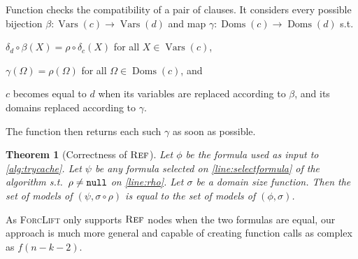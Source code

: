 \documentclass{article}
\newtheorem{theorem}{Theorem}
\newcommand{\nulll}{\texttt{\textup{null}}}
\DeclareMathOperator{\Reff}{\textsc{Ref}}
\DeclareMathOperator{\dom}{dom}
\DeclareMathOperator{\Doms}{Doms}
\DeclareMathOperator{\Vars}{Vars}
\begin{document}
Function \generateMaps checks the compatibility of a pair of clauses. It
considers every possible bijection $\beta\colon \Vars(c) \to \Vars(d)$ and map
$\gamma\colon \Doms(c) \to \Doms(d)$ s.t.
\begin{enumerate*}[label=(\roman*)]
  \item $\delta_{d} \circ \beta(X) = \rho \circ \delta_{c}(X)$ for all
  $X \in \Vars(c)$,
  \item $\gamma(\Omega) = \rho(\Omega)$ for all $\Omega \in \Doms(c)$, and
  \item $c$ becomes equal to $d$ when its variables are replaced according to
  $\beta$, and its domains replaced according to $\gamma$.
\end{enumerate*}
The function then returns each such $\gamma$ as soon as possible.



\begin{theorem}[Correctness of $\Reff$]
  Let $\phi$ be the formula used as input to \cref{alg:trycache}. Let $\psi$ be
  any formula selected on \cref{line:selectformula} of the algorithm s.t.\
  $\rho \ne \nulll$ on \cref{line:rho}. Let $\sigma$ be a domain size function.
  Then the set of models of $(\psi, \sigma \circ \rho)$ is equal to the set of
  models of $(\phi, \sigma)$.
\end{theorem}

As \textsc{ForcLift} only supports $\Reff$ nodes when the two formulas are
equal, our approach is much more general and capable of creating function calls
as complex as $f(n-k-2)$.
\end{document}
